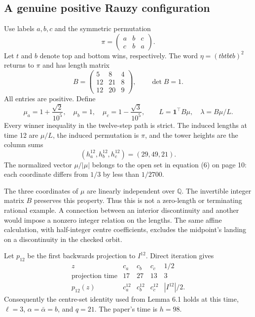 \documentclass[10pt]{article}
\begin{document}
\subsection*{A genuine positive Rauzy configuration}
Use labels \(a,b,c\) and the symmetric permutation \[\pi=\begin{pmatrix}a&b&c\\c&b&a\end{pmatrix}.\] Let \(t\) and \(b\) denote top and bottom wins, respectively. The word \(\eta=(tbtbtb)^2\) returns to \(\pi\) and has length matrix \[B=\begin{pmatrix}5&8&4\\12&21&8\\12&20&9\end{pmatrix},
 \qquad \det B=1.\] All entries are positive. Define \[\mu_a=1+\frac{\sqrt2}{10^5},\quad
 \mu_b=1,\quad
 \mu_c=1-\frac{\sqrt3}{10^5},\qquad
 L=\mathbf1^{\top}B\mu,\quad \lambda=B\mu/L.\] Every winner inequality in the twelve-step path is strict. The induced lengths at time 12 are \(\mu/L\), the induced permutation is \(\pi\), and the tower heights are the column sums \[(h_a^{12},h_b^{12},h_c^{12})=(29,49,21).\] The normalized vector \(\mu/|\mu|\) belongs to the open set in equation (6) on page 10: each coordinate differs from \(1/3\) by less than \(1/2700\).\par
The three coordinates of \(\mu\) are linearly independent over \(\mathbb Q\). The invertible integer matrix \(B\) preserves this property. Thus this is not a zero-length or terminating rational example. A connection between an interior discontinuity and another would impose a nonzero integer relation on the lengths. The same affine calculation, with half-integer centre coefficients, excludes the midpoint’s landing on a discontinuity in the checked orbit.\par
Let \(p_{12}\) be the first backwards projection to \(I^{12}\). Direct iteration gives \[\begin{array}{c|rrrr}
 z&c_a&c_b&c_c&1/2\\ \hline
 \text{projection time}&17&27&13&3\\
 p_{12}(z)&c_a^{12}&c_b^{12}&c_c^{12}&|I^{12}|/2 .
\end{array}\] Consequently the centre-set identity used from Lemma 6.1 holds at this time, \(\ell=3\), \(\alpha=\bar\alpha=b\), and \(q=21\). The paper’s time is \(h=98\).\par
\end{document}
